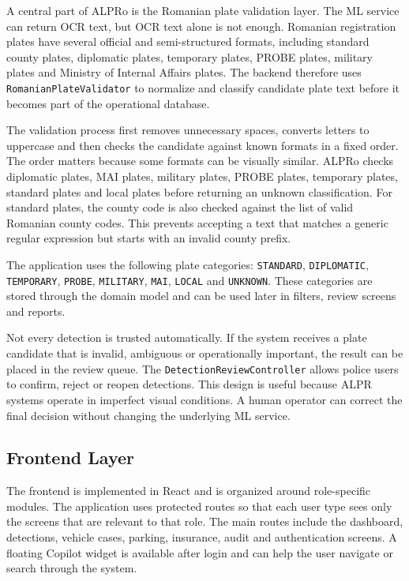 ﻿\documentclass[12pt,a4paper]{article}
\begin{document}
A central part of ALPRo is the Romanian plate validation layer. The ML service can return OCR text, but OCR text alone is not enough. Romanian registration plates have several official and semi-structured formats, including standard county plates, diplomatic plates, temporary plates, PROBE plates, military plates and Ministry of Internal Affairs plates. The backend therefore uses \texttt{RomanianPlateValidator} to normalize and classify candidate plate text before it becomes part of the operational database.

The validation process first removes unnecessary spaces, converts letters to uppercase and then checks the candidate against known formats in a fixed order. The order matters because some formats can be visually similar. ALPRo checks diplomatic plates, MAI plates, military plates, PROBE plates, temporary plates, standard plates and local plates before returning an unknown classification. For standard plates, the county code is also checked against the list of valid Romanian county codes. This prevents accepting a text that matches a generic regular expression but starts with an invalid county prefix.

The application uses the following plate categories: \texttt{STANDARD}, \texttt{DIPLOMATIC}, \texttt{TEMPORARY}, \texttt{PROBE}, \texttt{MILITARY}, \texttt{MAI}, \texttt{LOCAL} and \texttt{UNKNOWN}. These categories are stored through the domain model and can be used later in filters, review screens and reports.

Not every detection is trusted automatically. If the system receives a plate candidate that is invalid, ambiguous or operationally important, the result can be placed in the review queue. The \texttt{DetectionReviewController} allows police users to confirm, reject or reopen detections. This design is useful because ALPR systems operate in imperfect visual conditions. A human operator can correct the final decision without changing the underlying ML service.

\subsection{Frontend Layer}

The frontend is implemented in React and is organized around role-specific modules. The application uses protected routes so that each user type sees only the screens that are relevant to that role. The main routes include the dashboard, detections, vehicle cases, parking, insurance, audit and authentication screens. A floating Copilot widget is available after login and can help the user navigate or search through the system.
\end{document}
